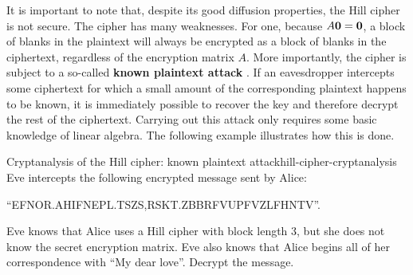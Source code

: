 It is important to note that, despite its good diffusion properties,
the Hill cipher is not secure. The cipher has many weaknesses. For
one, because $A\mbox{\bf 0}=\mbox{\bf 0}$, a block of blanks in the plaintext
will always be encrypted as a block of blanks in the ciphertext,
regardless of the encryption matrix $A$. More importantly, the cipher
is subject to a so-called \textbf{known plaintext attack}%
.  If an eavesdropper intercepts
some ciphertext for which a small amount of the corresponding
plaintext happens to be known, it is immediately possible to recover
the key and therefore decrypt the rest of the ciphertext. Carrying out
this attack only requires some basic knowledge of linear algebra. The
following example illustrates how this is done.

\begin{example}{Cryptanalysis of the Hill cipher: known plaintext attack}{hill-cipher-cryptanalysis}
  Eve intercepts the following encrypted message sent by Alice:
  \begin{center}
    ``EFNOR.AHIFNEPL.TSZS,RSKT.ZBBRFVUPFVZLFHNTV''.
  \end{center}
  Eve knows that Alice uses a Hill cipher with block length 3, but she
  does not know the secret encryption matrix. Eve also knows that
  Alice begins all of her correspondence with ``My dear
  love''. Decrypt the message.
\end{example}

